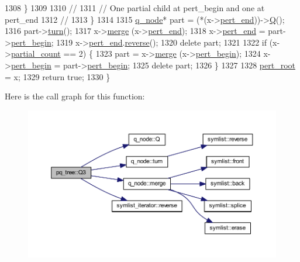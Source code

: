\begin{DoxyCode}
1308     \}
1309     
1310     \textcolor{comment}{//}
1311     \textcolor{comment}{// One partial child at pert\_begin and one at pert\_end}
1312     \textcolor{comment}{// }
1313     \}
1314     
1315     \mbox{\hyperlink{classq__node}{q\_node}}* part = (*(x->\mbox{\hyperlink{classq__node_a7a331cc1f5d9f7b4b77b7b25b4976c3b}{pert\_end}}))->\mbox{\hyperlink{classq__node_a9252fff1e71e91e318268bdb50b9056f}{Q}}();
1316     part->\mbox{\hyperlink{classq__node_a0a33d0dea66058a8a69c61a06593f0e1}{turn}}();
1317     x->\mbox{\hyperlink{classq__node_a14ffd1793cc2feb83a8d552b2c8d7cca}{merge}} (x->\mbox{\hyperlink{classq__node_a7a331cc1f5d9f7b4b77b7b25b4976c3b}{pert\_end}});
1318     x->\mbox{\hyperlink{classq__node_a7a331cc1f5d9f7b4b77b7b25b4976c3b}{pert\_end}} = part->\mbox{\hyperlink{classq__node_ac636443853e4074a0e6c441d7bcb249a}{pert\_begin}};
1319     x->\mbox{\hyperlink{classq__node_a7a331cc1f5d9f7b4b77b7b25b4976c3b}{pert\_end}}.\mbox{\hyperlink{structsymlist__iterator_a4135864290fda971467e41869b20e904}{reverse}}();
1320     \textcolor{keyword}{delete} part;
1321     
1322     \textcolor{keywordflow}{if} (x->\mbox{\hyperlink{classq__node_a7ba602eae7be6811ac965bf95521a513}{partial\_count}} == 2) \{
1323     part = x->\mbox{\hyperlink{classq__node_a14ffd1793cc2feb83a8d552b2c8d7cca}{merge}} (x->\mbox{\hyperlink{classq__node_ac636443853e4074a0e6c441d7bcb249a}{pert\_begin}});
1324     x->\mbox{\hyperlink{classq__node_ac636443853e4074a0e6c441d7bcb249a}{pert\_begin}} = part->\mbox{\hyperlink{classq__node_ac636443853e4074a0e6c441d7bcb249a}{pert\_begin}};
1325     \textcolor{keyword}{delete} part;
1326     \}
1327     
1328     \mbox{\hyperlink{classpq__tree_adf0d16ca5a29bfbe863efb525135ac01}{pert\_root}} = x;
1329     \textcolor{keywordflow}{return} \textcolor{keyword}{true};
1330 \}
\end{DoxyCode}
Here is the call graph for this function\+:\nopagebreak
\begin{figure}[H]
\begin{center}
\leavevmode
\includegraphics[width=350pt]{classpq__tree_aaf2d4b1daf78f11cb3377d40a8125ac1_cgraph}
\end{center}
\end{figure}
